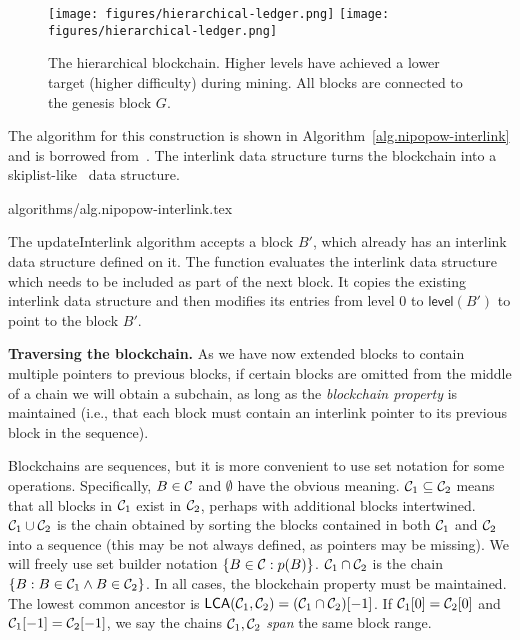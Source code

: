 \begin{figure}
    \caption{The hierarchical blockchain.
    Higher levels have achieved a lower target (higher difficulty) during
    mining. All blocks are connected to the genesis block $G$.}
    \centering
    \iftwocolumn
        \texttt{[image: figures/hierarchical-ledger.png]}
    \else
        \texttt{[image: figures/hierarchical-ledger.png]}
    \fi
    \label{fig.hierarchy}
\end{figure}

The algorithm for this construction is shown in
Algorithm~\ref{alg.nipopow-interlink} and is borrowed from~\cite{KLS}. The
interlink data structure turns the blockchain into a
skiplist-like~\cite{skiplist} data structure.

{algorithms/alg.nipopow-interlink.tex}

The updateInterlink algorithm accepts a block $B'$, which already has an
interlink data structure defined on it. The function evaluates the
interlink data structure which needs to be included as part of the next block.
It copies the existing interlink data structure and
then modifies its entries from level $0$ to $\textsf{level}(B')$ to
point to the block $B'$.

\noindent\textbf{Traversing the blockchain. }
As we have now extended blocks to contain multiple pointers to previous blocks,
if certain blocks are omitted from the middle of a chain we will obtain a
subchain, as long as the \emph{blockchain property} is maintained (i.e., that
each block must contain an interlink pointer to its previous block in the
sequence).

Blockchains are sequences, but it is more convenient to use set notation for
some operations. Specifically, $B \in \mathcal{C}$ and $\emptyset$ have the obvious
meaning. $\mathcal{C}_1 \subseteq \mathcal{C}_2$ means that all blocks in $\mathcal{C}_1$ exist
in $\mathcal{C}_2$, perhaps with additional blocks intertwined. $\mathcal{C}_1 \cup
\mathcal{C}_2$ is the chain obtained by sorting the blocks contained in both
$\mathcal{C}_1$ and $\mathcal{C}_2$ into a sequence (this may be not always defined, as
pointers may be missing). We will freely use set builder notation $\{B \in
\mathcal{C}: p(B)\}$. $\mathcal{C}_1 \cap \mathcal{C}_2$ is the chain $\{B: B \in \mathcal{C}_1
\land B \in \mathcal{C}_2\}$. In all cases, the blockchain property must be
maintained. The lowest common ancestor is $\textsf{LCA}(\mathcal{C}_1, \mathcal{C}_2) =
(\mathcal{C}_1 \cap \mathcal{C}_2)[-1]$. If $\mathcal{C}_1[0] = \mathcal{C}_2[0]$ and $\mathcal{C}_1[-1]
= \mathcal{C}_2[-1]$, we say the chains $\mathcal{C}_1, \mathcal{C}_2$ \emph{span} the same
block range.

